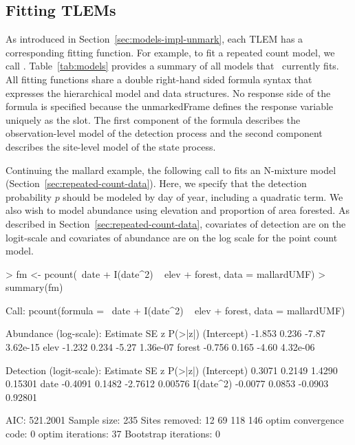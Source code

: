 \documentclass[article,shortnames]{jss}
\newcommand{\um}{\pkg{unmarked}}
\begin{document}



\subsection{Fitting TLEMs}
\label{sec:fitting-models}

As introduced in Section~\ref{sec:models-impl-unmark}, each TLEM has a
corresponding fitting function.  For example, to fit a repeated count
model, we call .  Table~\ref{tab:models} provides a
summary of all models that \um\ currently fits.  All fitting functions
share a double right-hand sided formula syntax that expresses the
hierarchical model and data structures.  No response side of the formula is
specified because the unmarkedFrame defines the response variable
uniquely as the  slot.  The first component of the formula
describes the observation-level model of the detection process and the
second component describes the site-level model of the state process.

Continuing the mallard example, the following call to 
fits an N-mixture model (Section~\ref{sec:repeated-count-data}).  Here,
we specify that the detection probability $p$ should be modeled by day
of year, including a quadratic term.  We also wish to model abundance
using elevation and proportion of area forested.  As described in
Section~\ref{sec:repeated-count-data}, covariates of detection are on the
logit-scale and covariates of abundance are on the log scale for the
point count model.

\begin{Schunk}
\begin{Sinput}
> fm <- pcount(~date + I(date^2) ~ elev + forest, data = mallardUMF)
> summary(fm)
\end{Sinput}
\begin{Soutput}
Call:
pcount(formula = ~date + I(date^2) ~ elev + forest, data = mallardUMF)

Abundance (log-scale):
            Estimate    SE     z  P(>|z|)
(Intercept)   -1.853 0.236 -7.87 3.62e-15
elev          -1.232 0.234 -5.27 1.36e-07
forest        -0.756 0.165 -4.60 4.32e-06

Detection (logit-scale):
            Estimate     SE       z P(>|z|)
(Intercept)   0.3071 0.2149  1.4290 0.15301
date         -0.4091 0.1482 -2.7612 0.00576
I(date^2)    -0.0077 0.0853 -0.0903 0.92801

AIC: 521.2001 
Sample size: 235
Sites removed: 12 69 118 146
optim convergence code: 0
optim iterations: 37 
Bootstrap iterations: 0 
\end{Soutput}
\end{Schunk}
\end{document}
